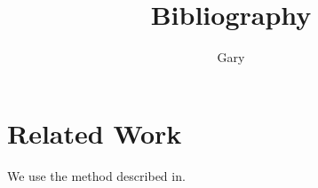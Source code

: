 \documentclass[a4paper, twocolumn]{article}
\title{Bibliography}
\date{}
\author{Gary}
\begin{document}
 
	\maketitle	 
	
	\begin{abstract}
		\lipsum[1]
	\end{abstract}
	
	\tableofcontents
	
	\section{Related Work}
	We use the method described in. \cite{8949510,Jang1993}
	
	
	
	
\end{document}

